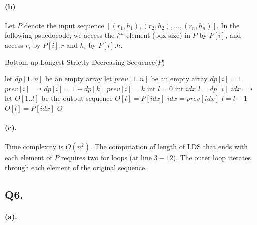 \documentclass[12pt]{article}
\begin{document}
\paragraph{(b)} Let \(P\) denote the input sequence \([(r_1,h_1), (r_2,h_2), \hdots, (r_n,h_n)]\). In the following psuedocode, we access the \(i^{th}\) element (box size) in \(P\) by \(P[i]\), and access \(r_i\) by \(P[i].r\) and  \(h_i\) by \(P[i].h\).
\begin{algorithm}[H]
     \caption{Bottom-up Longest Strictly Decreasing Sequence(\(P\))}
     \begin{algorithmic}[1]
     \State let \(dp[1..n]\) be an empty array 
     \State let \(prev[1..n]\) be an empty array 
          \State \(dp[i] = 1\)
          \State \(prev[i] = i\)
                    \State \(dp[i] = 1 + dp[k]\)
                    \State \(prev[i] = k\)
               \EndIf
          \EndFor
     \EndFor
     \State int \(l = 0\)
     \State int \(idx\) 
               \State \(l = dp[i]\) 
               \State \(idx = i\) 
          \EndIf
     \EndFor
     \State let \(O[1..l]\) be the output sequence
          \State \(O[l] = P[idx]\)
          \State \(idx = prev[idx]\)
          \State \(l = l - 1\)
     \EndWhile
     \State \(O[l] = P[idx]\)
     \State \Return \(O\)
     \end{algorithmic}
\end{algorithm}

\paragraph{(c).} Time complexity is \(O(n^2)\). The computation of length of LDS that ends with each element of \(P\) requires two for loops (at line \(3-12\)). The outer loop iterates through each element of the original sequence.


\subsection*{Q6.}
\paragraph{(a).}
\end{document}
